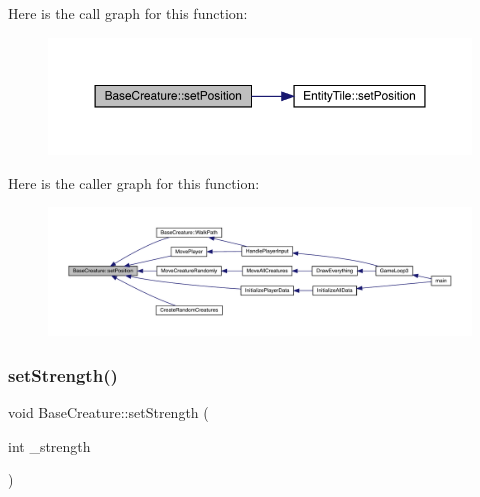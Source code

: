 Here is the call graph for this function\+:
\nopagebreak
\begin{figure}[H]
\begin{center}
\leavevmode
\includegraphics[width=350pt]{d2/d3b/class_base_creature_a00ffc1ee732a8f0a8921c9cee6842e4d_cgraph}
\end{center}
\end{figure}
Here is the caller graph for this function\+:
\nopagebreak
\begin{figure}[H]
\begin{center}
\leavevmode
\includegraphics[width=350pt]{d2/d3b/class_base_creature_a00ffc1ee732a8f0a8921c9cee6842e4d_icgraph}
\end{center}
\end{figure}
\mbox{\label{class_base_creature_a3a2eb318b9c5d849a02884b20e32f83d}} 
\subsubsection{\texorpdfstring{set\+Strength()}{setStrength()}}
{\footnotesize\ttfamily void Base\+Creature\+::set\+Strength (\begin{DoxyParamCaption}\item[{int}]{\+\_\+strength }\end{DoxyParamCaption})}

\mbox{\label{class_base_creature_a82f847585033035597700b071e40611f}} 
